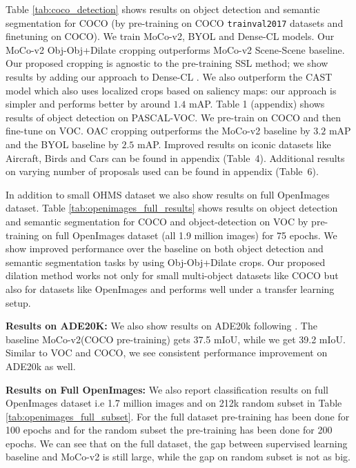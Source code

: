 Table  \ref{tab:coco_detection} shows results on object detection and semantic segmentation for COCO (by pre-training on COCO \texttt{trainval2017} datasets and finetuning on COCO). We train MoCo-v2, BYOL and Dense-CL models. Our MoCo-v2 Obj-Obj+Dilate cropping outperforms MoCo-v2 Scene-Scene baseline.  Our proposed cropping is agnostic to the pre-training SSL method; we show  results by adding our approach to Dense-CL \cite{wang2021dense}. We also outperform the CAST model \cite{selvaraju2020casting} which also uses localized crops based on saliency maps: our approach is simpler and performs better by around $1.4$ mAP. Table 1 (appendix) shows results of object detection on PASCAL-VOC. We pre-train on COCO and then fine-tune on VOC. OAC cropping outperforms the MoCo-v2 baseline by $3.2$ mAP and the BYOL baseline by $2.5$ mAP. Improved results on iconic datasets like Aircraft, Birds and Cars can be found in appendix (Table~4). Additional results on varying number of proposals used can be found in appendix (Table~6). 

In addition to small OHMS dataset we also show results on full OpenImages dataset.
Table \ref{tab:openimages_full_results} shows results  on object detection and semantic segmentation for COCO and object-detection on VOC by pre-training on full OpenImages dataset \cite{kuznetsova2020open} (all 1.9 million images) for 75 epochs. We show improved performance over the baseline on both object detection and semantic segmentation tasks by using Obj-Obj+Dilate crops. Our proposed dilation method works not only for small multi-object datasets like COCO but also for datasets like OpenImages and performs well under a transfer learning setup.

{\textbf{Results on ADE20K:} We also show results on ADE20k following \cite{Chen2017RethinkingAC}. The baseline MoCo-v2(COCO pre-training) gets 37.5 mIoU, while we get 39.2 mIoU. Similar to VOC and COCO, we see consistent performance improvement on ADE20k as well.}

{\textbf{Results on Full OpenImages:} We also report classification results on full OpenImages dataset i.e 1.7 million images and on 212k random subset in Table \ref{tab:openimages_full_subset}. For the full dataset pre-training has been done for 100 epochs and for the random subset the pre-training has been done for 200 epochs. We can see that on the full dataset, the gap between supervised learning baseline and MoCo-v2 is still large, while the gap on random subset is not as big.}

